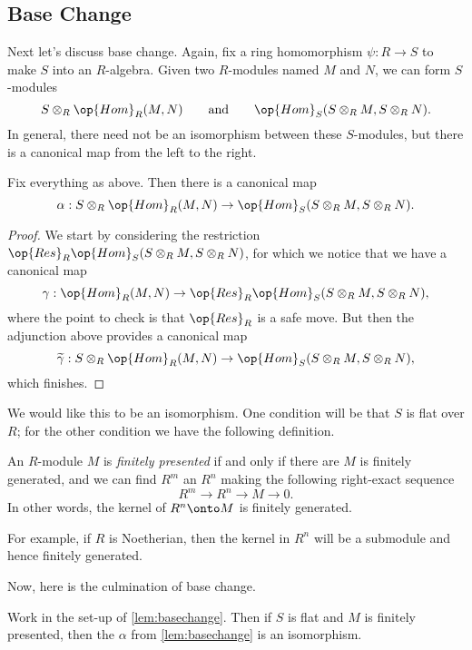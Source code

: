 \subsection{Base Change}
Next let's discuss base change. Again, fix a ring homomorphism $\psi:R\to S$ to make $S$ into an $R$-algebra. Given two $R$-modules named $M$ and $N$, we can form $S$-modules
\[S\otimes_R\op{Hom}_R(M,N)\qquad\text{and}\qquad\op{Hom}_S(S\otimes_RM,S\otimes_RN).\]
In general, there need not be an isomorphism between these $S$-modules, but there is a canonical map from the left to the right.
\begin{lemma} \label{lem:basechange}
	Fix everything as above. Then there is a canonical map
	\[\alpha:S\otimes_R\op{Hom}_R(M,N)\to\op{Hom}_S(S\otimes_RM,S\otimes_RN).\]
\end{lemma}
\begin{proof}
	We start by considering the restriction $\op{Res}_R\op{Hom}_S(S\otimes_RM,S\otimes_RN)$, for which we notice that we have a canonical map
	\[\gamma:\op{Hom}_R(M,N)\to\op{Res}_R\op{Hom}_S(S\otimes_RM,S\otimes_RN),\]
	where the point to check is that $\op{Res}_R$ is a safe move. But then the adjunction above provides a canonical map
	\[\widetilde\gamma:S\otimes_R\op{Hom}_R(M,N)\to\op{Hom}_S(S\otimes_RM,S\otimes_RN),\]
	which finishes. 
\end{proof}
We would like this to be an isomorphism. One condition will be that $S$ is flat over $R$; for the other condition we have the following definition.
\begin{definition}
	An $R$-module $M$ is \textit{finitely presented} if and only if there are $M$ is finitely generated, and we can find $R^m$ an $R^n$ making the following right-exact sequence
	\[R^m\to R^n\to M\to 0.\]
	In other words, the kernel of $R^n\onto M$ is finitely generated.
\end{definition}
\begin{example}
	For example, if $R$ is Noetherian, then the kernel in $R^n$ will be a submodule and hence finitely generated.
\end{example}
Now, here is the culmination of base change.
\begin{proposition}
	Work in the set-up of \autoref{lem:basechange}. Then if $S$ is flat and $M$ is finitely presented, then the $\alpha$ from \autoref{lem:basechange} is an isomorphism.
\end{proposition}
